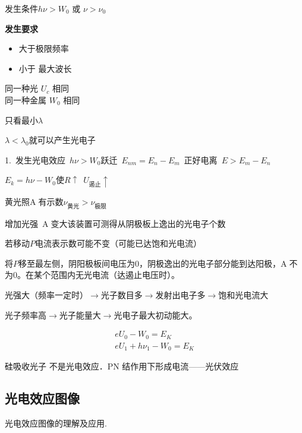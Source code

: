 \noindent 发生条件\quad $h\nu>W_0$ 或 $\nu>\nu_0$

\noindent \textbf{发生要求}
\begin{itemize}
\item 大于极限频率
\item 小于 最大波长
\end{itemize}

\noindent 同一种光 $U_c$ 相同\\
同一种金属 $W_0$ 相同


只看最小$\lambda$ %

$\lambda<\lambda_0$就可以产生光电子

1.\ 发生光电效应\ $h\nu>W_0$\quad 跃迁\ $E_{nm}=E_n-E_m$\ 正好\quad 电离\ $E>E_m-E_n$ %

$E_k=h\nu-W_0$\hfill 使$R\uparrow$\ $U_{\text{遏止}}\uparrow$ %

黄光照\textcircled{A}有示数\quad $\nu_{\text{黄光}}>\nu_{\text{极限}}$ %

增加光强\ \textcircled{A}变大\qquad 该装置可测得从阴极板上逸出的光电子个数

若移动$P$电流表示数可能不变（可能已达饱和光电流） %

将$P$移至最左侧，阴阳极板间电压为0，阴极逸出的光电子部分能到达阳极，\textcircled{A}不为0。在某个范围内无光电流（达遏止电压时）。

光强大（频率一定时）$\to$光子数目多$\to$发射出电子多$\to$饱和光电流大

光子频率高$\to$光子能量大$\to$光电子最大初动能大。

\begin{gather*}
eU_0-W_0=E_K\\
eU_1+h\nu_1-W_0=E_K
\end{gather*}

硅吸收光子 不是光电效应．PN 结作用下形成电流——光伏效应%

\subsection{光电效应图像}
光电效应图像的理解及应用.

